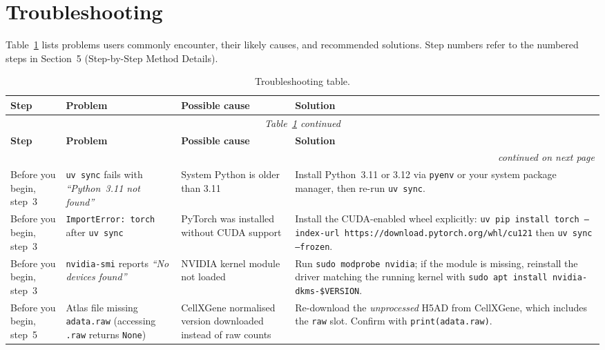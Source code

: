 \documentclass[12pt, a4paper]{article}
\begin{document}
\section{Troubleshooting}

Table~\ref{tab:trouble} lists problems users commonly encounter,
their likely causes, and recommended solutions.
Step numbers refer to the numbered steps in
Section~5 (Step-by-Step Method Details).

\begingroup
\small
\setlength{\LTpre}{6pt}
\setlength{\LTpost}{6pt}
\begin{longtable}{p{1.6cm} p{3.8cm} p{3.8cm} p{5.4cm}}
\caption{Troubleshooting table.}
\label{tab:trouble} \\
\toprule
\textbf{Step} & \textbf{Problem} & \textbf{Possible cause} & \textbf{Solution} \\
\midrule
\endfirsthead
\multicolumn{4}{c}{\small\itshape Table~\ref{tab:trouble} continued} \\
\toprule
\textbf{Step} & \textbf{Problem} & \textbf{Possible cause} & \textbf{Solution} \\
\midrule
\endhead
\midrule
\multicolumn{4}{r}{\small\itshape continued on next page} \\
\endfoot
\bottomrule
\endlastfoot

Before you begin, step~3 &
\texttt{uv sync} fails with \textit{``Python~3.11 not found''} &
System Python is older than 3.11 &
Install Python~3.11 or 3.12 via \texttt{pyenv} or your system package
manager, then re-run \texttt{uv sync}. \\[4pt]

Before you begin, step~3 &
\texttt{ImportError: torch} after \texttt{uv sync} &
PyTorch was installed without CUDA support &
Install the CUDA-enabled wheel explicitly:
\texttt{uv pip install torch --index-url https://download.pytorch.org/whl/cu121}
then \texttt{uv sync --frozen}. \\[4pt]

Before you begin, step~3 &
\texttt{nvidia-smi} reports \textit{``No devices found''} &
NVIDIA kernel module not loaded &
Run \texttt{sudo modprobe nvidia}; if the module is missing, reinstall
the driver matching the running kernel with
\texttt{sudo apt install nvidia-dkms-\$VERSION}. \\[4pt]

Before you begin, step~5 &
Atlas file missing \texttt{adata.raw} (accessing \texttt{.raw} returns
\texttt{None}) &
CellXGene normalised version downloaded instead of raw counts &
Re-download the \textit{unprocessed} H5AD from CellXGene, which
includes the \texttt{raw} slot. Confirm with
\texttt{print(adata.raw)}. \\[4pt]


\end{longtable}
\end{document}
